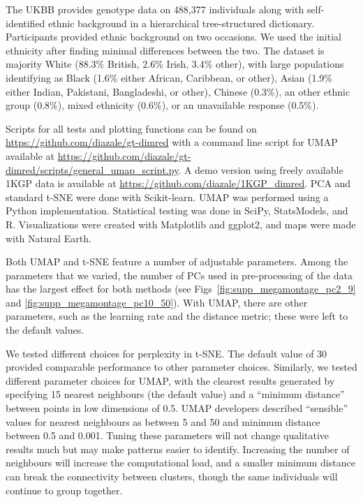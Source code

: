 The UKBB provides genotype data on 488,377 individuals along with self-identified ethnic background in a hierarchical tree-structured dictionary. Participants provided ethnic background on two occasions. We used the initial ethnicity after finding minimal differences between the two. The dataset is majority White (88.3\% British, 2.6\% Irish, 3.4\% other), with large populations identifying as Black (1.6\% either African, Caribbean, or other), Asian (1.9\% either Indian, Pakistani, Bangladeshi, or other), Chinese (0.3\%), an other ethnic group (0.8\%), mixed ethnicity (0.6\%), or an unavailable response (0.5\%). 

Scripts for all tests and plotting functions can be found on \url{https://github.com/diazale/gt-dimred} with a command line script for UMAP available at \url{https://github.com/diazale/gt-dimred/scripts/general_umap_script.py}. A demo version using freely available 1KGP data is available at \url{https://github.com/diazale/1KGP_dimred}. PCA and standard t-SNE were done with Scikit-learn\citep{scikit-learn}. UMAP was performed using a Python implementation\citep{2018arXivUMAP}. Statistical testing was done in SciPy\citep{scipy}, StatsModels\citep{seabold2010statsmodels}, and R\citep{r2013}. Visualizations were created with Matplotlib\citep{Hunter2007} and ggplot2\citep{ggplot2016}, and maps were made with Natural Earth.

Both UMAP and t-SNE feature a number of adjustable parameters. Among the parameters that we varied, the number of PCs used in pre-processing of the data has the largest effect for both methods (see Figs~\ref{fig:supp_megamontage_pc2_9} and \ref{fig:supp_megamontage_pc10_50}). With UMAP, there are other parameters, such as the learning rate and the distance metric; these were left to the default values.

We tested different choices for perplexity in t-SNE. The default value of 30 provided comparable performance to other parameter choices.  Similarly, we tested different parameter choices for UMAP, with the clearest results generated by specifying 15 nearest neighbours (the default value) and a ``minimum distance'' between points in low dimensions of 0.5. UMAP developers described ``sensible'' values for nearest neighbours as between 5 and 50 and minimum distance between 0.5 and 0.001. Tuning these parameters will not change qualitative results much but may make patterns easier to identify. Increasing the number of neighbours will increase the computational load, and a smaller minimum distance can break the connectivity between clusters, though the same individuals will continue to group together.

